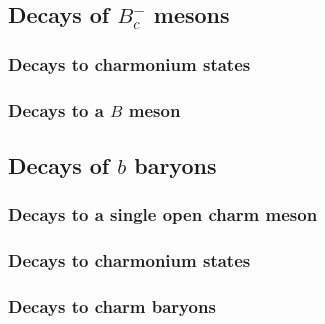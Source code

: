 \subsection{Decays of $B_c^-$ mesons}

\subsubsection{Decays to charmonium states}

\subsubsection{Decays to a $B$ meson}


\subsection{Decays of $b$ baryons}

\subsubsection{Decays to a single open charm meson}

\subsubsection{Decays to charmonium states}

\subsubsection{Decays to charm baryons}


\renewcommand{\tablename}{Table}

